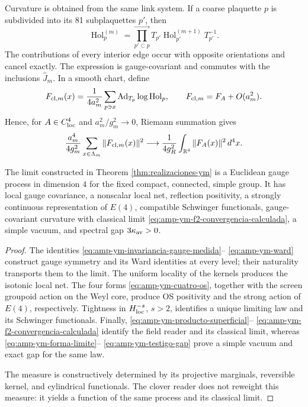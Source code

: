 Curvature is obtained from the same link system. If a coarse
plaquette \(p\) is subdivided into its 81 subplaquettes \(p'\), then
\begin{equation}\label{eq:amp-ym-producto-superficial}
 \operatorname{Hol}^{(m)}_{p}
 =\prod_{p'\subset p}^{\longrightarrow}
 T_{p'}\operatorname{Hol}^{(m+1)}_{p'}T_{p'}^{-1}.
\end{equation}
The contributions of every interior edge occur with opposite
orientations and cancel exactly. The expression is gauge-covariant and
commutes with the inclusions \(\widehat J_m\). In a smooth chart, define
\begin{equation}\label{eq:amp-ym-clover-definido}
 F_{{\rm cl},m}(x)
 =\frac1{4a_m^2}\sum_{p\ni x}
 \operatorname{Ad}_{T_p}\log\operatorname{Hol}_{p},
 \qquad
 F_{{\rm cl},m}=F_A+O(a_m^2).
\end{equation}
Hence, for \(A\in C^4_{\rm loc}\) and
\(a_m^2/g_m^2\to0\), Riemann summation gives
\begin{equation}\label{eq:amp-ym-f2-convergencia-calculada}
 \frac{a_m^4}{4g_m^2}
 \sum_{x\in\Lambda_m}\|F_{{\rm cl},m}(x)\|^2
 \longrightarrow
 \frac1{4g_R^2}\int_{\mathbb R^4}\|F_A(x)\|^2\,d^4x.
\end{equation}

\begin{theorem}
\label{thm:amp-ym-identificacion-gauge}
The limit constructed in Theorem
\ref{thm:realizaciones-ym} is a Euclidean gauge process in dimension
\(4\) for the fixed compact, connected, simple group. It has
local gauge covariance, a nonscalar local net, reflection
positivity, a strongly continuous representation of \(E(4)\),
compatible Schwinger functionals, gauge-covariant curvature with classical
limit \eqref{eq:amp-ym-f2-convergencia-calculada}, a simple vacuum, and spectral
gap
\(3\kappa_{\rm av}>0\).
\end{theorem}

\begin{proof}
The identities \eqref{eq:amp-ym-invariancia-gauge-medida}--
\eqref{eq:amp-ym-ward} construct gauge symmetry and its Ward
identities at every level; their naturality transports them to the limit. The
uniform locality of the kernels produces the isotonic local net. The
four forms \eqref{eq:amp-ym-cuatro-os}, together with the screen
groupoid action on the Weyl core, produce OS positivity and the strong
action of \(E(4)\), respectively. Tightness in
\(H^{-s}_{\rm loc}\), \(s>2\), identifies a unique limiting law and its
Schwinger functionals. Finally,
\eqref{eq:amp-ym-producto-superficial}--
\eqref{eq:amp-ym-f2-convergencia-calculada} identify the field reader
and its classical limit, whereas
\eqref{eq:amp-ym-forma-limite}--
\eqref{eq:amp-ym-testigo-gap} prove a simple vacuum and exact gap for the
same law.

The measure is constructively determined by its projective
marginals, reversible kernel, and cylindrical functionals. The clover
reader does not reweight this measure: it yields a function of the same process and its
classical limit.
\end{proof}

